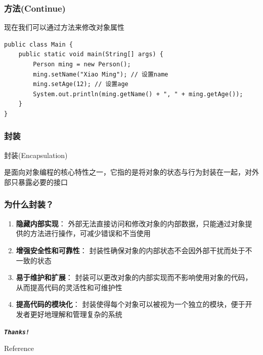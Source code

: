 \documentclass[UTF8, 16pt]{beamer}
\begin{document}
\begin{frame}[fragile]
    \frametitle{方法(Continue)}
    \textcolor{sufered}{现在我们可以通过方法来修改对象属性}
    \begin{lstlisting}
public class Main {
    public static void main(String[] args) {
        Person ming = new Person();
        ming.setName("Xiao Ming"); // 设置name
        ming.setAge(12); // 设置age
        System.out.println(ming.getName() + ", " + ming.getAge());
    }
}
    \end{lstlisting}
\end{frame}

\begin{frame}
    \frametitle{封装}
    \textcolor{sufered}{封装(Encapsulation)}

    是面向对象编程的核心特性之一，它指的是将对象的状态与行为封装在一起，对外部只暴露必要的接口
\end{frame}

\begin{frame}
    \frametitle{为什么封装？}

    \begin{enumerate}
        \item \textbf{隐藏内部实现}：
              外部无法直接访问和修改对象的内部数据，只能通过对象提供的方法进行操作，可减少错误和不当使用

        \item \textbf{增强安全性和可靠性}：
              封装性确保对象的内部状态不会因外部干扰而处于不一致的状态

        \item \textbf{易于维护和扩展}：
              封装可以更改对象的内部实现而不影响使用对象的代码，从而提高代码的灵活性和可维护性

        \item \textbf{提高代码的模块化}：
              封装使得每个对象可以被视为一个独立的模块，便于开发者更好地理解和管理复杂的系统
    \end{enumerate}
\end{frame}

\begin{frame}[allowframebreaks]%
    \begin{center}
        \Huge\textbf{\textit{\texttt{Thanks!}}}
    \end{center}
\end{frame}

\appendix
\begin{frame}{Reference}
    \nocite{corejava}
    \nocite{liaoxuefeng}
    \addtocounter{framenumber}{-1}
    \printbibliography{} %
\end{frame}
\end{document}
